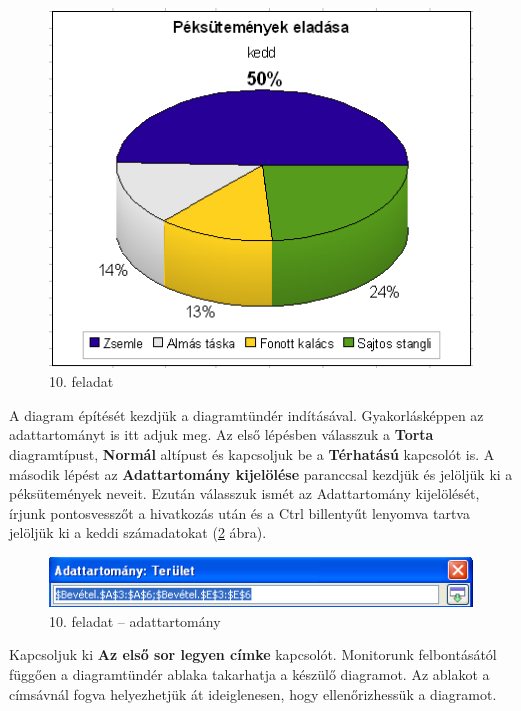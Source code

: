 \begin{figure}[!h]
\begin{center}
\includegraphics[width=11.324cm]{oocalcv1-img59.png}
\caption{10. feladat}\label{10-feladat}
\end{center}
\end{figure}

A diagram építését kezdjük a diagramtündér
indításával. Gyakorlásképpen az adattartományt is itt adjuk
meg. Az első lépésben válasszuk a \textbf{Torta}
diagramtípust, \textbf{Normál} altípust és kapcsoljuk be a
\textbf{Térhatású} kapcsolót is. A második lépést az
\textbf{Adattartomány kijelölése} paranccsal kezdjük és
jelöljük ki a péksütemények neveit. Ezután válasszuk
ismét az Adattartomány kijelölését, írjunk
pontosvesszőt a hivatkozás után és a Ctrl billentyűt
lenyomva tartva jelöljük ki a keddi számadatokat
(\ref{10-feladatAdattartomány} ábra).

\begin{figure}[!h]
\begin{center}
\includegraphics[width=11.589cm]{oocalcv1-img60.png}
\caption{10.  feladat --  adattartomány}\label{10-feladatAdattartomány}
\end{center}
\end{figure}

Kapcsoljuk ki \textbf{Az első sor legyen címke} kapcsolót.
Monitorunk felbontásától függően a diagramtündér ablaka
takarhatja a készülő diagramot. Az ablakot a címsávnál
fogva helyezhetjük át ideiglenesen, hogy ellenőrizhessük a
diagramot.

